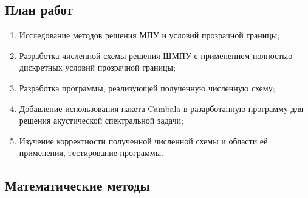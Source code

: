 \documentclass{fefu}
\begin{document}
        \subsection{План работ}
            \begin{enumerate}
                \item Исследование методов решения МПУ и условий прозрачной границы;
                \item Разработка численной схемы решения ШМПУ с применением полностью дискретных условий прозрачной границы;
                \item Разработка программы, реализующей полученную численную схему;
                \item Добавление использования пакета Cambala в разарботанную программу для решения акустической спектральной задачи;
                \item Изучение корректности полученной численной схемы и области её применения, тестирование программы.
            \end{enumerate}
        \subsection{Математические методы}
\end{document}
